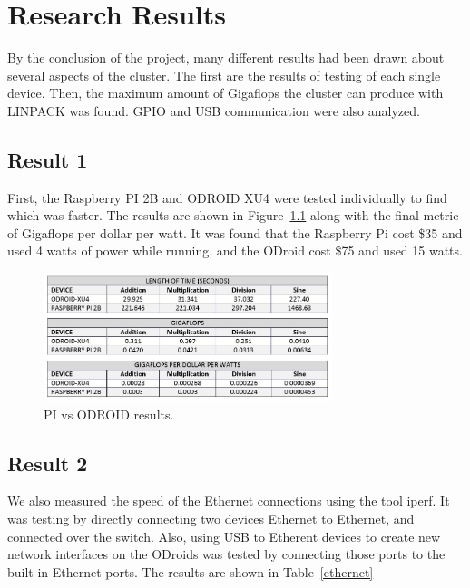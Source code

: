 

\chapter{Research Results}


By the conclusion of the project, many different results had been drawn about several aspects of the cluster. The first are the results of testing of each single device. Then, the maximum amount of Gigaflops the cluster can produce with LINPACK was found. GPIO and USB communication were also analyzed. 

\section{Result 1}

First, the Raspberry PI 2B and ODROID XU4 were tested individually to find which was faster. The results are shown in Figure~\ref{pivodroid} along with the final metric of Gigaflops per dollar per watt. It was found that the Raspberry Pi cost \$35 and used 4 watts of power while running, and the ODroid cost \$75 and used 15 watts. 

\begin{figure}[tbh]
\begin{center}
\includegraphics[width=0.75\textwidth]{pivsxu4table2.JPG}
\end{center}
\caption{PI vs ODROID results. \label{pivodroid}}
\end{figure}

\section{Result 2}

We also measured the speed of the Ethernet connections using the tool iperf. It was testing by directly connecting two devices Ethernet to Ethernet, and connected over the switch. Also, using USB to Etherent devices to create new network interfaces on the ODroids was tested by connecting those ports to the built in Ethernet ports. The results are shown in Table~\ref{ethernet}

